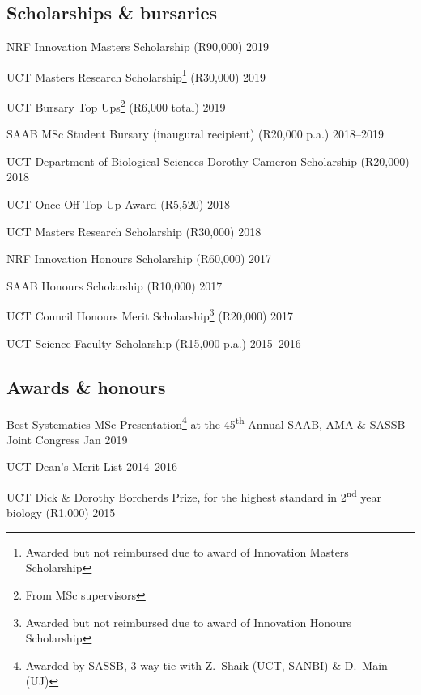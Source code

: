 \documentclass[10pt]{article}
\begin{document}
\subsection*{Scholarships \& bursaries}

NRF Innovation Masters Scholarship (R90,000)                         \hfill 2019

UCT Masters Research Scholarship\footnote{Awarded but not reimbursed
  due to award of Innovation Masters Scholarship} (R30,000)          \hfill 2019

UCT Bursary Top Ups\footnote{From MSc supervisors} (R6,000 total)    \hfill 2019

SAAB MSc Student Bursary (inaugural recipient) (R20,000 p.a.)  \hfill 2018--2019

UCT Department of Biological Sciences Dorothy Cameron Scholarship
  (R20,000)                                                          \hfill 2018

UCT Once-Off Top Up Award (R5,520)                                   \hfill 2018

UCT Masters Research Scholarship (R30,000)                           \hfill 2018

NRF Innovation Honours Scholarship (R60,000)                         \hfill 2017

SAAB Honours Scholarship (R10,000)                                   \hfill 2017

UCT Council Honours Merit Scholarship\footnote{Awarded but not
  reimbursed due to award of Innovation Honours Scholarship}
  (R20,000)                                                          \hfill 2017

UCT Science Faculty Scholarship (R15,000 p.a.)                 \hfill 2015--2016

\subsection*{Awards \& honours}

Best Systematics MSc Presentation\footnote{Awarded by SASSB,
  3-way tie with Z.~Shaik (UCT, SANBI) \& D.~Main (UJ)}
  at the 45\textsuperscript{th}
  Annual SAAB, AMA \& SASSB Joint Congress                       \hfill Jan 2019

UCT Dean's Merit List                                          \hfill 2014--2016

UCT Dick \& Dorothy Borcherds Prize, for the highest standard in 
  2\textsuperscript{nd} year biology (R1,000)                        \hfill 2015
\end{document}
